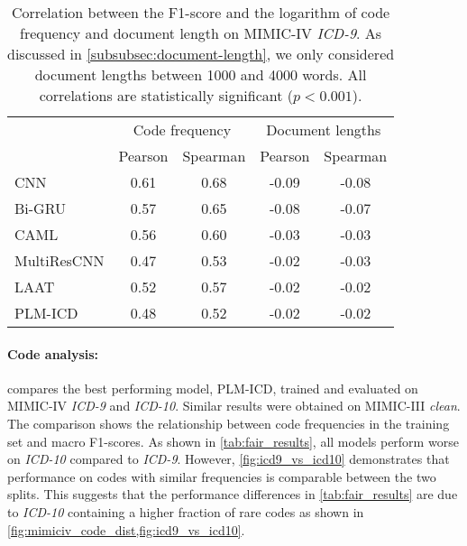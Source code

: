 {\begin{table}
    \centering
    \caption[Correlation between the F1-score and the logarithm of code frequency and document length on MIMIC-IV \textit{ICD-9}.]{ Correlation between the F1-score and the logarithm of code frequency and document length on MIMIC-IV \textit{ICD-9}. As discussed in \cref{subsubsec:document-length}, we only considered document lengths between 1000 and 4000 words. All correlations are statistically significant ($p<0.001$).}
    \label{tab:correlations}
    \begin{tabular}{lcccc}
        \toprule
        & \multicolumn{2}{c}{Code frequency} & \multicolumn{2}{c}{Document lengths}\\
        \cmidrule(lr){2-3}\cmidrule(lr){4-5}
        & Pearson & Spearman & Pearson & Spearman \\
        \midrule
        CNN  & 0.61 & 0.68 & -0.09 & -0.08 \\
        Bi-GRU & 0.57 & 0.65 & -0.08 & -0.07 \\
        CAML & 0.56 & 0.60 & -0.03 & -0.03   \\
        MultiResCNN & 0.47 & 0.53 & -0.02 & -0.03  \\
        LAAT & 0.52 & 0.57 & -0.02 & -0.02 \\
        PLM-ICD & 0.48 & 0.52 & -0.02 & -0.02   \\
        \bottomrule
    \end{tabular}
\end{table}


\paragraph{Code analysis:}

 compares the best performing model, PLM-ICD, trained and evaluated on MIMIC-IV \textit{ICD-9} and \textit{ICD-10}. Similar results were obtained on MIMIC-III \textit{clean}.
The comparison shows the relationship between code frequencies in the training set and macro F1-scores. As shown in \cref{tab:fair_results}, all models perform worse on \textit{ICD-10} compared to \textit{ICD-9}. However, \cref{fig:icd9_vs_icd10} demonstrates that performance on codes with similar frequencies is comparable between the two splits. This suggests that the performance differences in \cref{tab:fair_results} are due to \textit{ICD-10} containing a higher fraction of rare codes as shown in \cref{fig:mimiciv_code_dist,fig:icd9_vs_icd10}.

}
